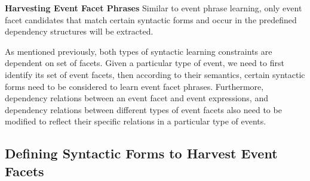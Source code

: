 \vspace{.1in}
\textbf{Harvesting Event Facet Phrases}
\vspace{.1in}
Similar to event phrase learning, 
only event facet candidates that match certain 
syntactic forms and occur in the predefined dependency structures will 
be extracted.


As mentioned previously, both types of syntactic learning constraints 
are 
dependent on set of facets. 
Given a particular type of event, we need to first 
identify its set of event facets, then according to 
their semantics, 
certain syntactic forms need to be considered to learn event facet phrases. 
Furthermore, dependency relations between an event facet and event expressions, 
and dependency relations between 
different types of event facets
also need to be modified to reflect their specific relations in a particular type of events.



\subsection{Defining Syntactic Forms to Harvest Event Facets}

